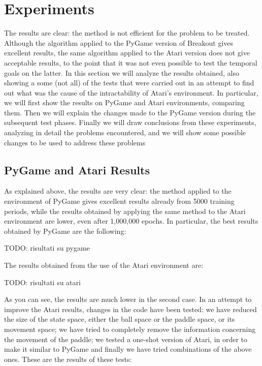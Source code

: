 \section{Experiments}
\label{subsec:experiments}

The results are clear: the method is not efficient for the problem to be treated. Although the algorithm applied to the PyGame version of Breakout gives excellent results, the same algorithm applied to the Atari version does not give acceptable results, to the point that it was not even possible to test the temporal goals on the latter. In this section we will analyze the results obtained, also showing a some (not all) of the tests that were carried out in an attempt to find out what was the cause of the intractability of Atari's environment. In particular, we will first show the results on PyGame and Atari environments, comparing them. Then we will explain the changes made to the PyGame version during the subsequent test phases. Finally we will draw conclusions from these experiments, analyzing in detail the problems encountered, and we will show some possible changes to be used to address these problems

\subsection{PyGame and Atari Results}

As explained above, the results are very clear: the method applied to the environment of PyGame gives excellent results already from 5000 training periods, while the results obtained by applying the same method to the Atari environment are lower, even after 1,000,000 epochs. In particular, the best results obtained by PyGame are the following:

\smallskip
TODO: risultati su pygame
\smallskip

The results obtained from the use of the Atari environment are:

\smallskip
TODO: risultati su atari
\smallskip

As you can see, the results are much lower in the second case. In an attempt to improve the Atari results, changes in the code have been tested: we have reduced the size of the state space, either the ball space or the paddle space, or its movement space; we have tried to completely remove the information concerning the movement of the paddle; we tested a one-shot version of Atari, in order to make it similar to PyGame and finally we have tried combinations of the above ones. These are the results of these tests:

